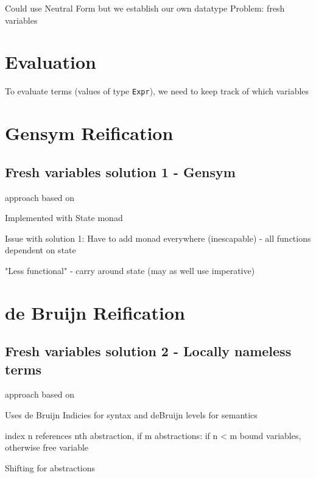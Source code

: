 Could use Neutral Form but we establish our own datatype
Problem: fresh variables

\section{Evaluation}
To evaluate terms (values of type \lstinline{Expr}), we need to keep track of which variables


\section{Gensym Reification}

\subsection{Fresh variables solution 1 - Gensym}
approach based on \cite{slides}

Implemented with State monad

Issue with solution 1: Have to add monad everywhere (inescapable) - all functions dependent on state

"Less functional" - carry around state (may as well use imperative)
\section{de Bruijn Reification}
\subsection{Fresh variables solution 2 - Locally nameless terms}
approach based on \cite{deBruijn}

Uses de Bruijn Indicies for syntax and deBruijn levels for semantics

index n references nth abstraction,
if m abstractions: if n < m bound variables, otherwise free variable

Shifting for abstractions
